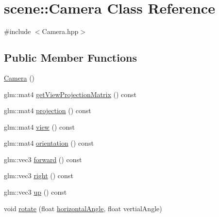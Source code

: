 \hypertarget{classscene_1_1Camera}{\section{scene\-:\-:Camera Class Reference}
\label{classscene_1_1Camera}
}


{\ttfamily \#include $<$Camera.\-hpp$>$}

\subsection*{Public Member Functions}
\begin{DoxyCompactItemize}
\item 
\hyperlink{classscene_1_1Camera_a63e00a22d01a16805b307fe906f4aac9}{Camera} ()
\item 
glm\-::mat4 \hyperlink{classscene_1_1Camera_afda540870d43cf8af88e235fad6b6e46}{get\-View\-Projection\-Matrix} () const 
\item 
glm\-::mat4 \hyperlink{classscene_1_1Camera_ae7eb9a1240b0da282ec5477cdebb09bd}{projection} () const 
\item 
glm\-::mat4 \hyperlink{classscene_1_1Camera_ae6e810cd3d8600603b3dac14270e6bcb}{view} () const 
\item 
glm\-::mat4 \hyperlink{classscene_1_1Camera_ab576798616a823814a3fe3c2b1b78508}{orientation} () const 
\item 
glm\-::vec3 \hyperlink{classscene_1_1Camera_a87676e090bd5d78ec6776577ae3ed8e8}{forward} () const 
\item 
glm\-::vec3 \hyperlink{classscene_1_1Camera_a3d62336da849d94673a6c45a15f8ed7c}{right} () const 
\item 
glm\-::vec3 \hyperlink{classscene_1_1Camera_a133e32063f7fc37614dc6b2baa454ed3}{up} () const 
\item 
void \hyperlink{classscene_1_1Camera_a314158de9932ef326ed7939447d414d1}{rotate} (float \hyperlink{classscene_1_1Camera_ac030c19e443554d8a5fa51d3cdf7facf}{horizontal\-Angle}, float vertial\-Angle)
\end{DoxyCompactItemize}
